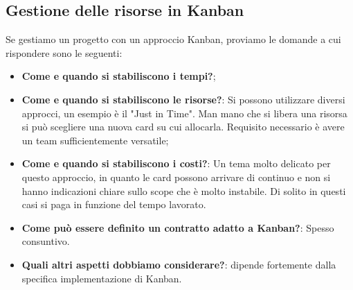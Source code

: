 \subsection{Gestione delle risorse in Kanban}
Se gestiamo un progetto con un approccio Kanban, proviamo le domande a cui rispondere sono le seguenti:
\begin{itemize}
	\item \textbf{Come e quando si stabiliscono i tempi?};
	\item \textbf{Come e quando si stabiliscono le risorse?}: Si possono utilizzare diversi approcci, un esempio è il "Just in Time". Man mano che si libera una risorsa si può scegliere una nuova card su cui allocarla. Requisito necessario è avere un team sufficientemente versatile;
	\item \textbf{Come e quando si stabiliscono i costi?}: Un tema molto delicato per questo approccio, in quanto le card possono arrivare di continuo e non si hanno indicazioni chiare sullo scope che è molto instabile. Di solito in questi casi si paga in funzione del tempo lavorato.
	\item \textbf{Come può essere definito un contratto adatto a Kanban?}: Spesso consuntivo.
	\item \textbf{Quali altri aspetti dobbiamo considerare?}: dipende fortemente dalla specifica implementazione di Kanban.
\end{itemize}
